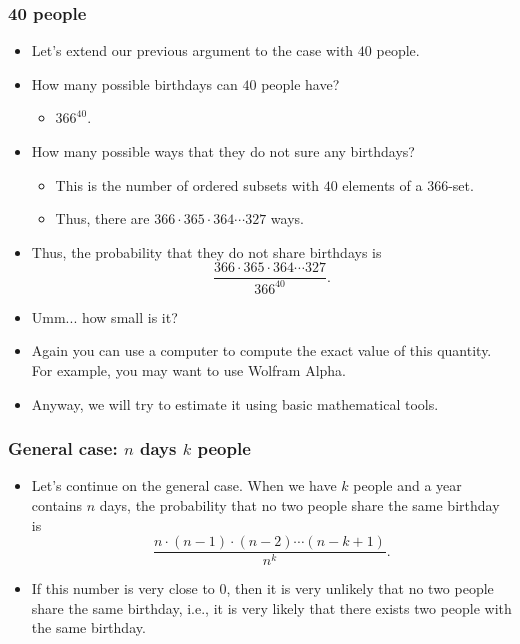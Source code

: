 \begin{frame}\frametitle{40 people}
  \begin{itemize}
  \item Let's extend our previous argument to the case with $40$ people.
  \item How many possible birthdays can $40$ people have? \pause
    \begin{itemize}
    \item $366^{40}$.
    \end{itemize}
    \pause
  \item How many possible ways that they do not sure any birthdays? \pause
    \begin{itemize}
    \item This is the number of ordered subsets with $40$ elements of
      a $366$-set. \pause
    \item Thus, there are $366\cdot 365\cdot 364\cdots 327$ ways.
    \end{itemize}
    \pause
  \item Thus, the probability that they do not share birthdays is
    \[\frac{366\cdot 365\cdot 364\cdots 327}{366^{40}}.\]
  \item \pause Umm... how small is it? \pause
  \item Again you can use a computer to compute the exact value of
    this quantity.  For example, you may want to use Wolfram Alpha.
    \pause

  \item Anyway, we will try to estimate it using basic mathematical
    tools.
  \end{itemize}
\end{frame}

\begin{frame}\frametitle{General case: $n$ days $k$ people}
  \begin{itemize}
  \item Let's continue on the general case.  When we have $k$ people
    and a year contains $n$ days, the probability that no two people
    share the same birthday is
    \[\frac{n\cdot (n-1)\cdot (n-2)\cdots (n-k+1)}{n^k}.\]
  \item \pause If this number is very close to 0, then it is very
    unlikely that no two people share the same birthday, i.e., it is
    very likely that there exists two people with the same birthday.
  \end{itemize}
\end{frame}

